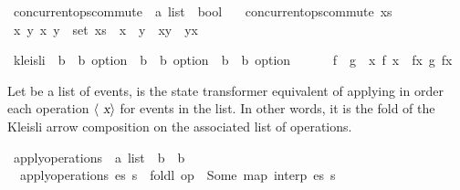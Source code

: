 \documentclass[acmlarge,review,anonymous]{acmart}\settopmatter{printfolios=true}
\begin{document}
\begin{isabellebody}
  \isanewline
{}\isamarkupfalse%
\ concurrent{\isacharunderscore}ops{\isacharunderscore}commute\ {\isacharcolon}{\isacharcolon}\ {\isachardoublequoteopen}{\isacharprime}a\ list\ {\isasymRightarrow}\ bool{\isachardoublequoteclose}\ \isanewline
\ \ {\isachardoublequoteopen}concurrent{\isacharunderscore}ops{\isacharunderscore}commute\ xs\ {\isasymequiv}
\ {\isasymforall}x\ y{\isachardot}\ {\isacharbraceleft}x{\isacharcomma}\ y{\isacharbraceright}\ {\isasymsubseteq}\ set\ xs\ {\isasymlongrightarrow}\ x\ {\isasymparallel}\ y\ {\isasymlongrightarrow}\ {\isasymlangle}x{\isasymrangle}{\isasymrhd}{\isasymlangle}y{\isasymrangle}\ {\isacharequal}\ {\isasymlangle}y{\isasymrangle}{\isasymrhd}{\isasymlangle}x{\isasymrangle}{\isachardoublequoteclose}\isanewline

\isamarkupfalse%
\ kleisli\ {\isacharcolon}{\isacharcolon}\ {\isachardoublequoteopen}{\isacharparenleft}{\isacharprime}b\ {\isasymRightarrow}\ {\isacharprime}b\ option{\isacharparenright}\ {\isasymRightarrow}\ {\isacharparenleft}{\isacharprime}b\ {\isasymRightarrow}\ {\isacharprime}b\ option{\isacharparenright}\ {\isasymRightarrow}\ {\isacharparenleft}{\isacharprime}b\ {\isasymRightarrow}\ {\isacharprime}b\ option{\isacharparenright}{\isachardoublequoteclose}\ {\isacharparenleft}\ {\isachardoublequoteopen}{\isasymrhd}{\isachardoublequoteclose}\ {}{}{\isacharparenright}\ \isanewline
\ \ {\isachardoublequoteopen}f\ {\isasymrhd}\ g\ {\isasymequiv}\ {\isasymlambda}x{\isachardot}\ f\ x\ {\isasymbind}\ {\isacharparenleft}{\isasymlambda}fx{\isachardot}\ g\ fx{\isacharparenright}{\isachardoublequoteclose}\isanewline
\end{isabellebody}

Let  be a list of events,  is the state
transformer equivalent of applying in order each operation $\langle \isa{x}
\rangle$ for events  in the list.  In other words, it is the fold of
the Kleisli arrow composition on the associated list of operations.

\begin{isabellebody}
  \isanewline
{}\isamarkupfalse%
\ apply{\isacharunderscore}operations\ {\isacharcolon}{\isacharcolon}\ {\isachardoublequoteopen}{\isacharprime}a\ list\ {\isasymRightarrow}\ {\isacharprime}b\ {\isasymrightharpoonup}\ {\isacharprime}b{\isachardoublequoteclose}\ \isanewline
\ \ {\isachardoublequoteopen}apply{\isacharunderscore}operations\ es\ s\ {\isasymequiv}\ {\isacharparenleft}foldl\ {\isacharparenleft}op\ {\isasymrhd}{\isacharparenright}\ Some\ {\isacharparenleft}map\ interp\ es{\isacharparenright}{\isacharparenright}\ s{\isachardoublequoteclose}\isanewline
\end{isabellebody}
\end{document}
